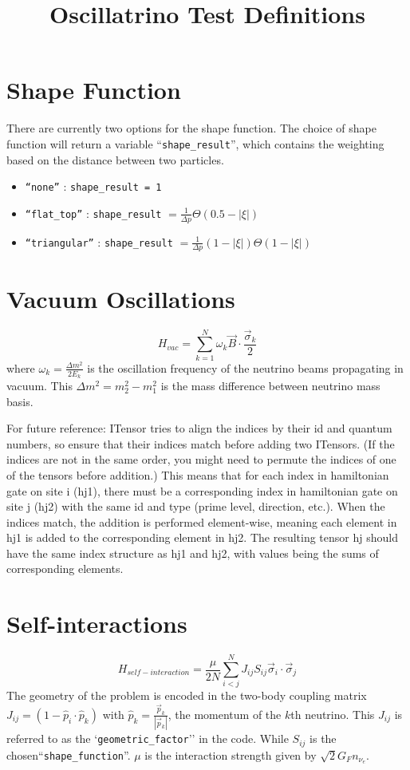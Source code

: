 \documentclass{article}
\title{Oscillatrino Test Definitions}
\begin{document}
\section{Shape Function}

There are currently two options for the shape function. The choice of shape function will return a variable ``{\tt shape\_result}'', which contains the weighting based on the distance between two particles.

\begin{itemize}
  \item {\tt ``none''} : {\tt shape\_result = 1}
  \item {\tt ``flat\_top''} : {\tt shape\_result} $= \frac{1}{\Delta p} \Theta(0.5-|\xi|)$
    \item {\tt ``triangular''} : {\tt shape\_result} $= \frac{1}{\Delta p} (1-|\xi|)\Theta(1-|\xi|)$
\end{itemize}

\section{Vacuum Oscillations}
\begin{equation}
H_{vac} = \sum_{k=1}^{N} \omega_k \vec{B} \cdot  \frac{{\vec\sigma}_k}{2} \end{equation}
where $ \omega_k = \frac{\Delta m^2}{2E_k} $ is the oscillation frequency of the neutrino beams propagating in vacuum. This $\Delta m^2 = m^2_2 - m^2_1 $ is the mass difference between neutrino mass basis.

For future reference: ITensor tries to align the indices by their id and quantum numbers, so ensure that their indices match before adding two ITensors. (If the indices are not in the same order, you might need to permute the indices of one of the tensors before addition.) This means that for each index in hamiltonian gate on site i (hj1), there must be a corresponding index in hamiltonian gate on site j (hj2) with the same id and type (prime level, direction, etc.). When the indices match, the addition is performed element-wise, meaning each element in hj1 is added to the corresponding element in hj2. The resulting tensor hj  should have the same index structure as hj1 and hj2, with values being the sums of corresponding elements.

\section{Self-interactions}
\begin{equation}
H_{self-interaction} =  \frac{\mu}{2N} \sum_{i<j}^{N} J_{ij} S_{ij}  \vec{\sigma}_i \cdot \vec{\sigma}_j 
\end{equation}
The geometry of the problem is encoded in the two-body coupling matrix \( J_{ij} = (1 - \hat{p}_i \cdot \hat{p}_k) \) with \( \hat{p}_k = \frac{\vec{p}_k}{|\vec{p}_k|} \), the momentum of the \(k\)th neutrino. This $J_{ij}$ is referred to as the `{\tt geometric\_factor}'' in the code. While $S_{ij}$ is the chosen``{\tt shape\_function}''. $\mu$ is the interaction strength given by  $ \sqrt{2} G_F {n_{\nu_e}}$.
\end{document}
